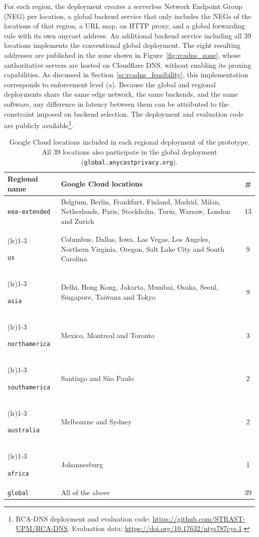 \documentclass[
A4paper,                %
twoside,                %
openright,              %
chapterprefix=true,     %
12pt,                   %
headings=normal,        %
titlepage=on            %
]{book}
\newcommand{\rowsep}[1]{%
    \arrayrulecolor{black!30}%
    \cmidrule[0.3pt](lr){1-#1}%
    \arrayrulecolor{black}%
}
\begin{document}
For each region, the deployment creates a serverless Network Endpoint Group (NEG) per location, a global backend service that only includes the NEGs of the locations of that region, a URL map, an HTTP proxy, and a global forwarding rule with its own anycast address. An additional backend service including all 39 locations implements the conventional global deployment. The eight resulting addresses are published in the zone shown in Figure~\ref{fig:rcadns_zone}, whose authoritative servers are hosted on Cloudflare DNS, without enabling its proxing capabilities. As discussed in Section~\ref{sc:rcadns_feasibility}, this implementation corresponds to enforcement level (a). Because the global and regional deployments share the same edge network, the same backends, and the same software, any difference in latency between them can be attributed to the constraint imposed on backend selection. The deployment and evaluation code are publicly available\footnote{RCA-DNS deployment and evaluation code: \url{https://github.com/STRAST-UPM/RCA-DNS}. Evaluation data: \url{https://doi.org/10.17632/ntys787cys.1}.}.

\begin{table}[ht]
    \centering
    \small
    \caption{Google Cloud locations included in each regional deployment of the prototype. All 39 locations also participate in the global deployment (\texttt{global.anycastprivacy.org}).}
    \label{tab:rcadns_gc_deployment}
    \begin{tabularx}{\textwidth}{>{\raggedright\arraybackslash}p{3.6cm} >{\raggedright\arraybackslash}X c}
        \toprule
        \textbf{Regional name} & \textbf{Google Cloud locations} & \textbf{\#} \\
        \midrule
        \texttt{eea-extended} & Belgium, Berlin, Frankfurt, Finland, Madrid, Milan, Netherlands, Paris, Stockholm, Turin, Warsaw, London and Zurich & 13 \\
        \rowsep{3}
        \texttt{us} & Columbus, Dallas, Iowa, Las Vegas, Los Angeles, Northern Virginia, Oregon, Salt Lake City and South Carolina & 9 \\
        \rowsep{3}
        \texttt{asia} & Delhi, Hong Kong, Jakarta, Mumbai, Osaka, Seoul, Singapore, Taiwana and Tokyo & 9 \\
        \rowsep{3}
        \texttt{northamerica} & Mexico, Montreal and Toronto & 3 \\
        \rowsep{3}
        \texttt{southamerica} & Santiago and São Paulo & 2 \\
        \rowsep{3}
        \texttt{australia} & Melbourne and Sydney & 2 \\
        \rowsep{3}
        \texttt{africa} & Johannesburg & 1 \\
        \midrule
        \texttt{global} & All of the above & 39 \\
        \bottomrule
    \end{tabularx}
\end{table}
\end{document}
